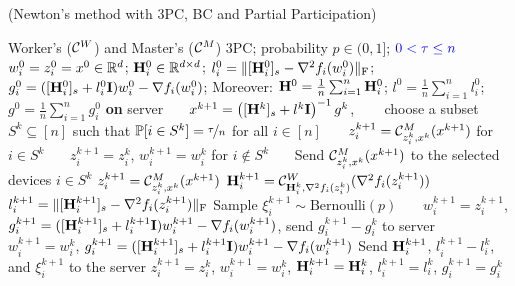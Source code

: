 \documentclass[11pt]{article}
\begin{document}
	
	\begin{algorithm}[h!]
		\caption{ (Newton's method with 3PC, BC and {\color{blue} Partial Participation})}
		\label{alg:BL2}
		\begin{algorithmic}[1]
			 Worker's (${\mathcal{C}}^W$) and Master's (${\mathcal{C}}^M$) 3PC; probability $p\in(0, 1]$; ${\color{blue}0<\tau \leq n}$
			$w^0_i = z^0_i = x^0 \in \mathbb{R}^d$; $\mathbf{H}_i^0 \in \mathbb{R}^{d\times d}$; $l_i^0 = \|[\mathbf{H}_i^{0}]_s - \nabla^2 f_i(w_i^{0})\|_{\rm F}$; $g_i^0 = ([\mathbf{H}_i^{0}]_s + l_i^{0} \mathbf{I})w_i^{0} - \nabla f_i(w_i^{0})$; Moreover: $\mathbf{H}^0 = \tfrac{1}{n} \sum_{i=1}^n \mathbf{H}_i^0$; $l^0 = \tfrac{1}{n} \sum_{i=1}^n l_i^0$; $g^0 = \tfrac{1}{n} \sum_{i=1}^n g_i^0$
			\STATE \textbf{on} server
			\STATE ~~~$x^{k+1} = \left(  [\mathbf{H}^k]_s + l^k\mathbf{I}  \right)^{-1} g^k$,
			\STATE ~~~{\color{blue} choose a subset $S^{k} \subseteq [n]$ such that $\mathbb{P}[ i \in S^k] = \nicefrac{\tau}{n}$ for all $i\in [n]$}
			\STATE ~~~$z_i^{k+1} = {\mathcal{C}}^M_{z_i^k, x^k} (x^{k+1})$ for $i \in S^k$ 
			\STATE ~~~$z_i^{k+1} = z_i^k$, \quad $w_i^{k+1} = w_i^k$ for $i \notin S^k$ 
			\STATE ~~~Send ${\mathcal{C}}^M_{z_i^k, x^k} (x^{k+1})$ to {\color{blue} the selected devices $i\in S^k$} 
			\STATE $z_i^{k+1} = {\mathcal{C}}^M_{z_i^k, x^k} (x^{k+1})$
			\STATE $\mathbf{H}_i^{k+1} = {\mathcal{C}}^W_{\mathbf{H}_i^k, \nabla^2 f_i(z_i^k)} (\nabla^2 f_i(z_i^{k+1}))$ 
			\STATE $l_i^{k+1} = \|[\mathbf{H}_i^{k+1}]_s - \nabla^2 f_i(z_i^{k+1})\|_{\rm F}$ 
			\STATE Sample $\xi_i^{k+1} \sim \text{Bernoulli}(p)$
			\STATE ~~~$w_i^{k+1} = z_i^{k+1}$, $g_i^{k+1} = ([\mathbf{H}_i^{k+1}]_s + l_i^{k+1} \mathbf{I})w_i^{k+1} - \nabla f_i(w_i^{k+1})$, send $g_i^{k+1}-g_i^k$ to server 
			\STATE ~~~$w_i^{k+1} = w_i^k$, $g_i^{k+1} = ([\mathbf{H}_i^{k+1}]_s + l_i^{k+1} \mathbf{I})w_i^{k+1} - \nabla f_i(w_i^{k+1})$ 
			\STATE Send $\mathbf{H}_i^{k+1}$, $l_i^{k+1} - l_i^k$, and $\xi_i^{k+1}$ to the server 
			\STATE $z_i^{k+1} = z_i^k$, $w_i^{k+1} = w_i^k$, $\mathbf{H}_i^{k+1} = \mathbf{H}_i^k$, $l_i^{k+1} = l_i^k$, $g_i^{k+1} = g_i^k$ 
			\ENDFOR
			

\end{algorithmic}
\end{algorithm}
\end{document}
